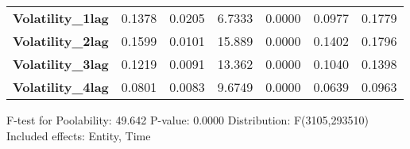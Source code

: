 \begin{center}
\begin{tabular}{lcccccc}
\textbf{Volatility\_1lag}                                &       0.1378       &       0.0205       &      6.7333     &      0.0000      &       0.0977      &       0.1779       \\
\textbf{Volatility\_2lag}                                &       0.1599       &       0.0101       &      15.889     &      0.0000      &       0.1402      &       0.1796       \\
\textbf{Volatility\_3lag}                                &       0.1219       &       0.0091       &      13.362     &      0.0000      &       0.1040      &       0.1398       \\
\textbf{Volatility\_4lag}                                &       0.0801       &       0.0083       &      9.6749     &      0.0000      &       0.0639      &       0.0963       \\
\bottomrule
\end{tabular}
\end{center}

F-test for Poolability: 49.642 \newline
 P-value: 0.0000 \newline
 Distribution: F(3105,293510) \newline
  \newline
 Included effects: Entity, Time